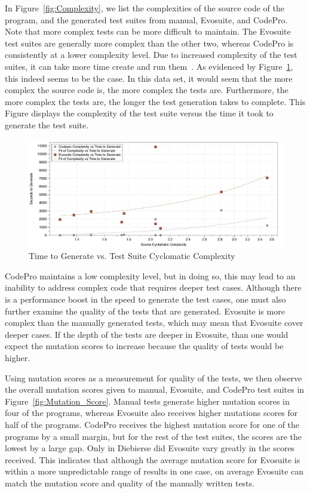 \documentclass[conference]{IEEEtran}
\begin{document}
In Figure~\ref{fig:Complexity}, we list the complexities of the source code of the program, and the generated test suites from manual, Evosuite, and CodePro. Note that more complex tests can be more difficult to maintain. The Evosuite test suites are generally more complex than the other two, whereas CodePro is consistently at a lower complexity level. Due to increased complexity of the test suites, it can take more time create and run them~\cite{alspaugh:2007}. As evidenced by Figure~\ref{fig:Time_Complexity}, this indeed seems to be the case. In this data set, it would seem that the more complex the source code is, the more complex the tests are. Furthermore, the more complex the tests are, the longer the test generation takes to complete. This Figure displays the complexity of the test suite versus the time it took to generate the test suite. 

\begin{figure}[!t]
\centering
  \includegraphics[width=\textwidth]{Time_Complexity}
    \caption{Time to Generate vs. Test Suite Cyclomatic Complexity}
  \label{fig:Time_Complexity}
\end{figure}


CodePro maintains a low complexity level, but in doing so, this may lead to an inability to address complex code that requires deeper test cases. Although there is a performance boost in the speed to generate the test cases, one must also further examine the quality of the tests that are generated. Evosuite is more complex than the manually generated tests, which may mean that Evosuite cover deeper cases. If the depth of the tests are deeper in Evosuite, than one would expect the mutation scores to increase because the quality of tests would be higher. 

Using mutation scores as a measurement for quality of the tests, we then observe the overall mutation scores given to manual, Evosuite, and CodePro test suites in Figure~\ref{fig:Mutation_Score}. Manual tests generate higher mutation scores in four of the programs, whereas Evosuite also receives higher mutations scores for half of the programs. CodePro receives the highest mutation score for one of the programs by a small margin, but for the rest of the test suites, the scores are the lowest by a large gap. Only in Diebierse did Evosuite vary greatly in the scores received. This indicates that although the average mutation score for Evosuite is within a more unpredictable range of results in one case, on average Evosuite can match the mutation score and quality of the manually written tests.
\end{document}
